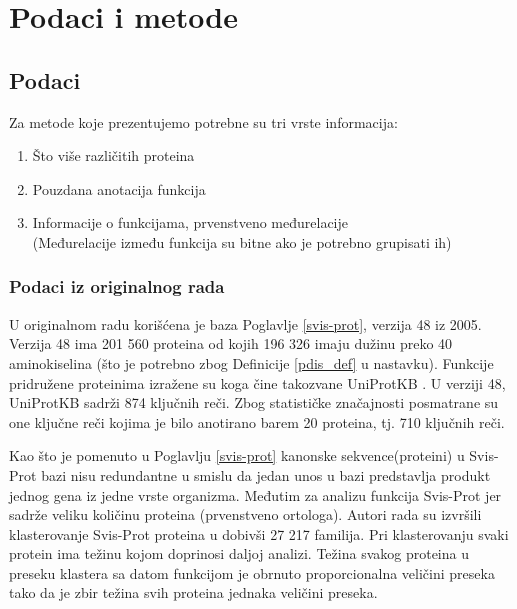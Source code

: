 
\chapter{Podaci i metode} %

\label{Podaci i metode} %



\section {Podaci}

Za metode koje prezentujemo potrebne su tri vrste informacija:
\begin{enumerate}
  \item Što više različitih proteina
  \item Pouzdana anotacija funkcija
  \item Informacije o funkcijama, prvenstveno međurelacije\\
    (Međurelacije između funkcija su bitne  ako je potrebno grupisati ih)
\end{enumerate}


\subsection{Podaci iz originalnog rada}

U originalnom radu \parencite{Xie2007} korišćena je  baza 
 Poglavlje \ref{svis-prot}, verzija 48 iz 2005.
Verzija 48 ima 201 560 proteina od kojih 196 326 imaju dužinu preko 40
aminokiselina (što je potrebno zbog Definicije \ref{pdis_def} u nastavku). Funkcije
pridružene proteinima izražene su 
 koga čine takozvane UniProtKB 
. U verziji 48, UniProtKB sadrži 874 ključnih reči.  Zbog
statističke značajnosti posmatrane su one ključne reči kojima je bilo anotirano
barem 20 proteina, tj. 710 ključnih reči.

Kao što je pomenuto u Poglavlju \ref{svis-prot} kanonske sekvence(proteini) u Svis-Prot
bazi nisu redundantne u smislu da jedan unos u bazi predstavlja produkt
jednog gena iz jedne vrste organizma. Međutim za analizu funkcija
Svis-Prot  \parencite{proveriti} jer
sadrže veliku količinu  proteina (prvenstveno ortologa).
Autori rada \parencite{Xie2007} su izvršili klasterovanje Svis-Prot
proteina u  dobivši 27 217 familija. Pri klasterovanju svaki protein
ima težinu kojom doprinosi daljoj analizi. Težina svakog proteina u preseku
klastera sa datom funkcijom je obrnuto proporcionalna veličini preseka
tako da je zbir težina svih proteina jednaka veličini preseka.

